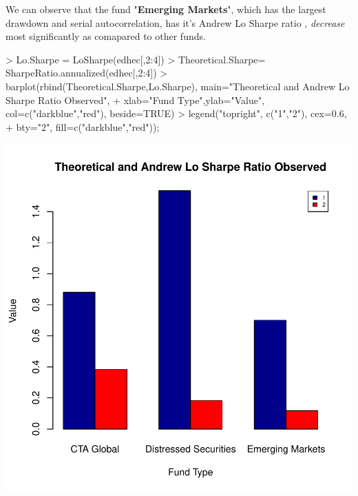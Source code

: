 \documentclass[12pt,letterpaper,english]{article}
\begin{document}
We can observe that the fund "\textbf{Emerging Markets}", which has the largest drawdown and serial autocorrelation, has it's Andrew Lo Sharpe ratio , \emph{decrease} most significantly as comapared to other funds.
\begin{Schunk}
\begin{Sinput}
> Lo.Sharpe = LoSharpe(edhec[,2:4])
> Theoretical.Sharpe= SharpeRatio.annualized(edhec[,2:4])
> barplot(rbind(Theoretical.Sharpe,Lo.Sharpe), main="Theoretical and Andrew Lo Sharpe Ratio Observed",
+          xlab="Fund Type",ylab="Value", col=c("darkblue","red"), beside=TRUE)
>    legend("topright", c("1","2"), cex=0.6, 
+                    bty="2", fill=c("darkblue","red"));
\end{Sinput}
\end{Schunk}
\includegraphics{LoSharpe-004}
\end{document}

